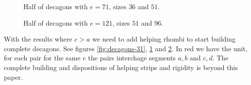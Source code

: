 \documentclass[11pt]{article}
\begin{document}
\begin{figure}[H]
\centering
{}
\caption{Half of decagons with $e=71$, sizes $36$ and $51$.}
\label{fig:decagons-71} 
\end{figure}


\begin{figure}[H]
\centering
{}
\caption{Half of decagons with $e=121$, sizes $51$ and $96$.}
\label{fig:decagons-121} 
\end{figure}

With the results where $c > a$ we need to add helping rhombi to start
building complete decagons. See figures \ref{fig:decagons-31},
\ref{fig:decagons-71} and \ref{fig:decagons-121}. In red we have the unit, for each
pair for the same $e$ the pairs interchage segments $a,b$ and $c,d$. The complete
building and dispositions of helping strips and rigidity is beyond this paper.
\end{document}
